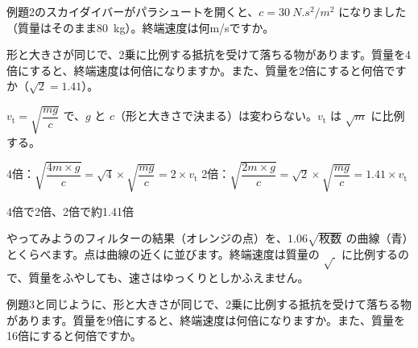\begin{jibun}
例題2のスカイダイバーがパラシュートを開くと、$c=\qty{30}{N.s^2/m^2}$ になりました（質量はそのまま\qty{80}{kg}）。終端速度は何m/sですか。
\end{jibun}

\begin{reidai}[質量を変えると]
形と大きさが同じで、2乗に比例する抵抗を受けて落ちる物があります。質量を4倍にすると、終端速度は何倍になりますか。また、質量を2倍にすると何倍ですか（$\sqrt2=1.41$）。\par
\kangaekata $v_{\mathrm t}=\sqrt{\dfrac{mg}{c}}$ で、$g$ と $c$（形と大きさで決まる）は変わらない。$v_{\mathrm t}$ は $\sqrt{m}$ に比例する。\par
\shiki 4倍：$\sqrt{\dfrac{4m\times g}{c}}=\sqrt4\times\sqrt{\dfrac{mg}{c}}=2\times v_{\mathrm t}$\bkvifq
2倍：$\sqrt{\dfrac{2m\times g}{c}}=\sqrt2\times\sqrt{\dfrac{mg}{c}}=1.41\times v_{\mathrm t}$\par
\kotae 4倍で2倍、2倍で約1.41倍
\end{reidai}
\noindent\begin{minipage}[c]{0.5\linewidth}
\end{minipage}\hfill
\begin{minipage}[c]{0.46\linewidth}\raggedright
やってみようのフィルターの結果（オレンジの点）を、$1.06\sqrt{\text{枚数}}$ の曲線（青）とくらべます。点は曲線の近くに並びます。終端速度は質量の $\sqrt{\ }$ に比例するので、質量をふやしても、速さはゆっくりとしかふえません。
\end{minipage}
\par\vspace{4pt}

\begin{jibun}
例題3と同じように、形と大きさが同じで、2乗に比例する抵抗を受けて落ちる物があります。質量を9倍にすると、終端速度は何倍になりますか。また、質量を16倍にすると何倍ですか。
\end{jibun}

